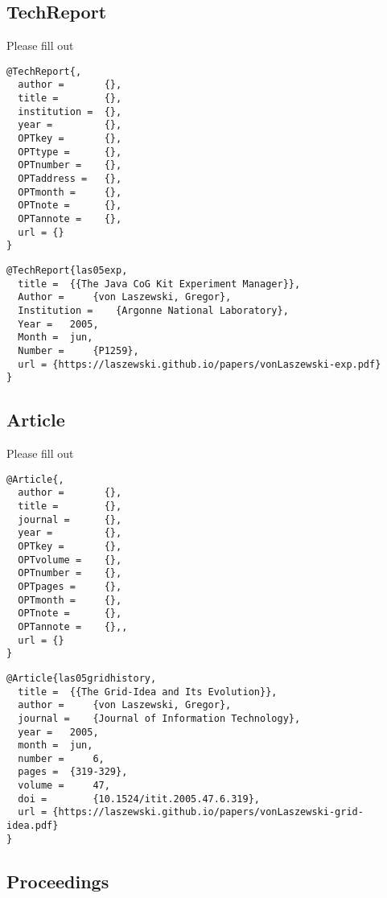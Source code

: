 \subsection{TechReport}\label{s:e:techreport}

Please fill out

\begin{verbatim}
@TechReport{,
  author =       {},
  title =        {},
  institution =  {},
  year =         {},
  OPTkey =       {},
  OPTtype =      {},
  OPTnumber =    {},
  OPTaddress =   {},
  OPTmonth =     {},
  OPTnote =      {},
  OPTannote =    {},
  url = {}    
}
\end{verbatim}

\begin{verbatim}
@TechReport{las05exp,
  title =  {{The Java CoG Kit Experiment Manager}},
  Author =     {von Laszewski, Gregor},
  Institution =    {Argonne National Laboratory},
  Year =   2005,
  Month =  jun,
  Number =     {P1259},
  url = {https://laszewski.github.io/papers/vonLaszewski-exp.pdf}
}
\end{verbatim}

\subsection{Article}

Please fill out

\begin{verbatim}
@Article{,
  author =       {},
  title =        {},
  journal =      {},
  year =         {},
  OPTkey =       {},
  OPTvolume =    {},
  OPTnumber =    {},
  OPTpages =     {},
  OPTmonth =     {},
  OPTnote =      {},
  OPTannote =    {},,
  url = {}
}
\end{verbatim}

\begin{verbatim}
@Article{las05gridhistory,
  title =  {{The Grid-Idea and Its Evolution}},
  author =     {von Laszewski, Gregor},
  journal =    {Journal of Information Technology},
  year =   2005,
  month =  jun,
  number =     6,
  pages =  {319-329},
  volume =     47,
  doi =        {10.1524/itit.2005.47.6.319},
  url = {https://laszewski.github.io/papers/vonLaszewski-grid-idea.pdf}
}
\end{verbatim}

\subsection{Proceedings}\label{s:e:proceedings}

